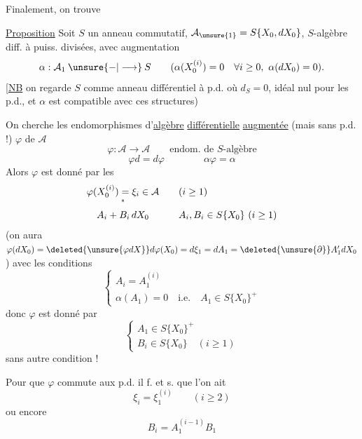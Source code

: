 Finalement, on trouve

\uline{Proposition} Soit $S$ un anneau commutatif,
$\mathcal A_{\unsure{1}}=S\{X_0,dX_0\}$,  $S$-algèbre
diff. à puiss. divisées, avec augmentation
\[
\alpha:\mathcal A_1\mathbin{\unsure{-|\longrightarrow}}S\qquad
(\alpha(X_0^{(i)})=0\quad\forall i\geq0,\ \alpha(dX_0)=0).
\]
[\uline{NB} on regarde  $S$ comme anneau
différentiel à p.d. où $d_S=0$, idéal nul pour
les p.d., et $\alpha$ est compatible avec ces structures)

On cherche les endomorphismes \inserted{$\varphi$} d'\uline{algèbre}
\uline{différentielle} \uline{augmentée} (mais sans
p.d. !) $\varphi$ de  $\mathcal A$
\[
\varphi:\mathcal A\longrightarrow\mathcal A\qquad\text{endom. de $S$-algèbre}
\]
\[
\varphi d=d\varphi
\qquad\qquad
\alpha\varphi=\alpha
\]
Alors $\varphi$ est donné par les
\[
\begin{array}{ccl}
\varphi(X_0^{(i)})=\xi_i\in\mathcal A&&(i\geq1)\\
\text{\textquotedbl}&&\\
A_i+B_i\,dX_0&&A_i,B_i\in S\{X_0\}\ (i\geq1)
\end{array}
\]
(on aura $\varphi(dX_0)=\deleted{\unsure{\varphi dX}}d\varphi(X_0)=d\xi_1=dA_1=\deleted{\unsure{\partial}}A'_1dX_0$)
avec les conditions
\[
\begin{cases}
A_i=A_1^{(i)}\\
\alpha(A_1)=0\quad\text{i.e.}\quad A_1\in S\{X_0\}^{+}
\end{cases}
\]
donc $\varphi$ est donné par
\[
\boxed{\boxed{\begin{cases}
A_1\in S\{X_0\}^{+}\\
B_i\in S\{X_0\}\quad(i\geq1)
\end{cases}}}
\]
sans autre condition !

Pour que $\varphi$ commute aux p.d. il f. et s.
que l'on ait
\[
\xi_i=\xi_1^{(i)}\qquad(i\geq2)
\]
ou encore
\[
B_i=A_1^{(i-1)}B_1
\]
